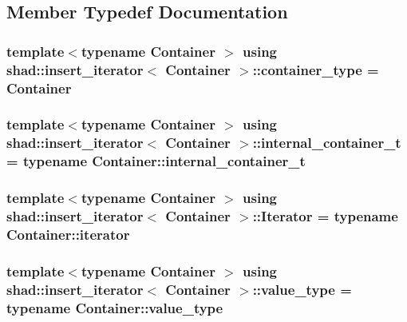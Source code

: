 \subsection{Member Typedef Documentation}
\hypertarget{classshad_1_1insert__iterator_a0ab6d747c808ebbaf2e00213490585f4}{
\subsubsection[{container\-\_\-type}]{\setlength{\rightskip}{0pt plus 5cm}template$<$typename Container $>$ using {\bf shad\-::insert\-\_\-iterator}$<$ Container $>$\-::{\bf container\-\_\-type} =  Container}}\label{classshad_1_1insert__iterator_a0ab6d747c808ebbaf2e00213490585f4}
\hypertarget{classshad_1_1insert__iterator_a040650a6a725c67ff6b4331cef06afaa}{
\subsubsection[{internal\-\_\-container\-\_\-t}]{\setlength{\rightskip}{0pt plus 5cm}template$<$typename Container $>$ using {\bf shad\-::insert\-\_\-iterator}$<$ Container $>$\-::{\bf internal\-\_\-container\-\_\-t} =  typename Container\-::internal\-\_\-container\-\_\-t\hspace{0.3cm}{\ttfamily [protected]}}}\label{classshad_1_1insert__iterator_a040650a6a725c67ff6b4331cef06afaa}
\hypertarget{classshad_1_1insert__iterator_a9423151fee020bc148d8c6037ecb0542}{
\subsubsection[{Iterator}]{\setlength{\rightskip}{0pt plus 5cm}template$<$typename Container $>$ using {\bf shad\-::insert\-\_\-iterator}$<$ Container $>$\-::{\bf Iterator} =  typename Container\-::iterator\hspace{0.3cm}{\ttfamily [protected]}}}\label{classshad_1_1insert__iterator_a9423151fee020bc148d8c6037ecb0542}
\hypertarget{classshad_1_1insert__iterator_a0a364f131900a4898acb9a8e499c6070}{
\subsubsection[{value\-\_\-type}]{\setlength{\rightskip}{0pt plus 5cm}template$<$typename Container $>$ using {\bf shad\-::insert\-\_\-iterator}$<$ Container $>$\-::{\bf value\-\_\-type} =  typename Container\-::value\-\_\-type}}\label{classshad_1_1insert__iterator_a0a364f131900a4898acb9a8e499c6070}


